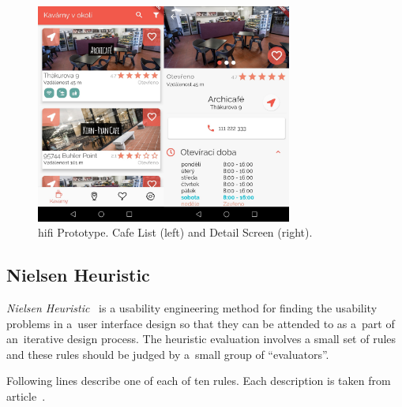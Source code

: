 \begin{figure}[htp]
    \centering
    \includegraphics[width=0.75\textwidth]{img/analysis/hifi.jpg}
    \caption{\gls{hifi} Prototype. Cafe List (left) and Detail Screen (right).}
    \label{fig:hifi}
\end{figure}
\subsection{Nielsen Heuristic}
\textit{Nielsen Heuristic}~\cite{nielsen} is a usability engineering method for finding the usability problems in a~user interface design so that they can be attended to as a~part of an~iterative design process. The heuristic evaluation involves a small set of rules and these rules should be judged by a~small group of ``evaluators''.

Following lines describe one of each of ten rules. Each description is taken from article~\cite{nielsen}.

